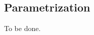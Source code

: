\documentclass[../thesis.tex]{subfiles}
\begin{document}
	
	\newpage
	
	\subsection{Parametrization}

	To be done.
\end{document}

